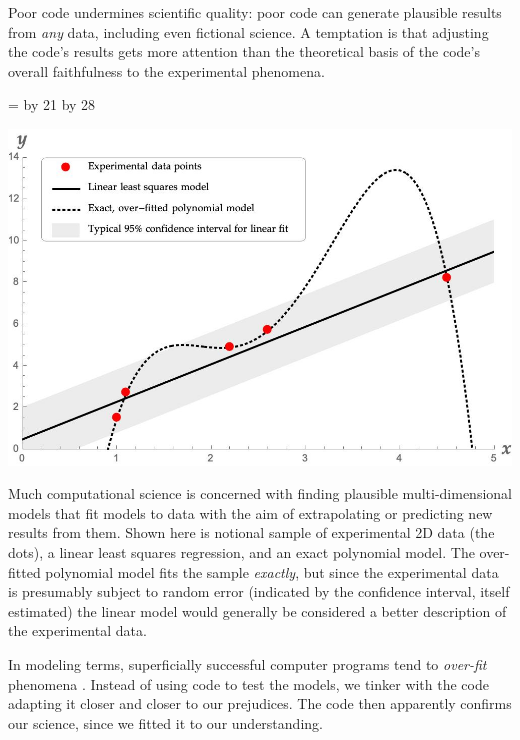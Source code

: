 \documentclass[11pt]{article}
\begin{document}
\noindent
Poor code undermines scientific quality: poor code can generate plausible results from \emph{any\/} data, including even fictional science. A temptation is that %
adjusting the code's results gets more attention than the theoretical basis of the code's overall faithfulness to the experimental phenomena. %
\def\imageWidthCalculation{\multiply \imageWidth by 21 \divide \imageWidth by 28}
\def\figureStarDetails{*}
\begin{figure\figureStarDetails}[t]
{ \newdimen \imageWidth 
  \imageWidth=\textwidth
  \imageWidthCalculation
  \begin{center}\includegraphics[width=\imageWidth]{generated/mathematicaplot.jpg}\end{center}}
\caption{Much computational science is concerned with finding plausible multi-dimensional models that fit models to data with the aim of extrapolating or predicting new results from them. Shown here is notional sample of experimental 2D data (the dots), a linear least squares regression, and an exact polynomial model. The over-fitted polynomial model fits the sample \emph{exactly\/}, but since the experimental data is presumably subject to random error (indicated by the confidence interval, itself estimated) the linear model would generally be considered a better description of the experimental data.}
\label{fig-overfit}
\end{figure\figureStarDetails}
In modeling terms, superficially successful computer programs tend to \emph{over-fit\/} phenomena \cite{over-fit}. Instead of using code to test the models, we tinker with the code adapting it closer and closer to our prejudices. The code then apparently confirms our science, since we fitted it to our understanding.  
\end{document}
